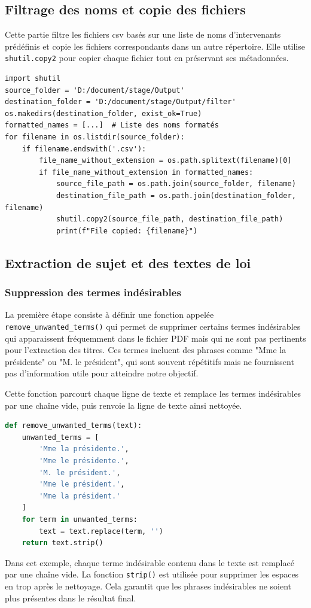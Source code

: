 \subsection{Filtrage des noms et copie des fichiers}
Cette partie filtre les fichiers \gls{csv} basés sur une liste de noms d'intervenants prédéfinis et copie les fichiers correspondants dans un autre répertoire. Elle utilise \texttt{shutil.copy2} pour copier chaque fichier tout en préservant ses métadonnées.
\begin{lstlisting}
import shutil
source_folder = 'D:/document/stage/Output'
destination_folder = 'D:/document/stage/Output/filter'
os.makedirs(destination_folder, exist_ok=True)
formatted_names = [...]  # Liste des noms formatés
for filename in os.listdir(source_folder):
    if filename.endswith('.csv'):
        file_name_without_extension = os.path.splitext(filename)[0]
        if file_name_without_extension in formatted_names:
            source_file_path = os.path.join(source_folder, filename)
            destination_file_path = os.path.join(destination_folder, filename)
            shutil.copy2(source_file_path, destination_file_path)
            print(f"File copied: {filename}")
\end{lstlisting}
\subsection{Extraction de sujet et des textes de loi}

\subsubsection{Suppression des termes indésirables}

La première étape consiste à définir une fonction appelée \texttt{remove\_unwanted\_terms()} qui permet de supprimer certains termes indésirables qui apparaissent fréquemment dans le fichier \gls{PDF} mais qui ne sont pas pertinents pour l'extraction des titres. Ces termes incluent des phrases comme "Mme la présidente" ou "M. le président", qui sont souvent répétitifs mais ne fournissent pas d'information utile pour atteindre notre objectif. 

Cette fonction parcourt chaque ligne de texte et remplace les termes indésirables par une chaîne vide, puis renvoie la ligne de texte ainsi nettoyée.

\begin{lstlisting}[language=Python]
def remove_unwanted_terms(text):
    unwanted_terms = [
        'Mme la présidente.',
        'Mme le présidente.',
        'M. le président.',
        'Mme le président.',
        'Mme la président.'
    ]
    for term in unwanted_terms:
        text = text.replace(term, '')
    return text.strip()
\end{lstlisting}
Dans cet exemple, chaque terme indésirable contenu dans le texte est remplacé par une chaîne vide. La fonction \texttt{strip()} est utilisée pour supprimer les espaces en trop après le nettoyage. Cela garantit que les phrases indésirables ne soient plus présentes dans le résultat final.

